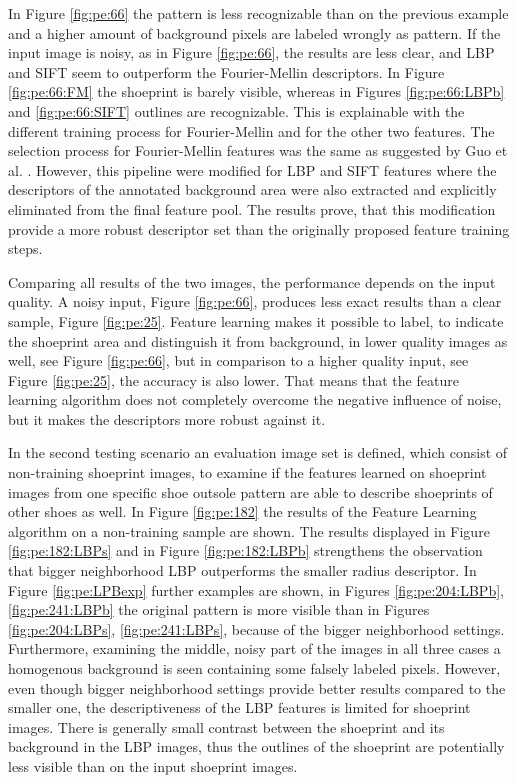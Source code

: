 \documentclass[draft,final]{vutinfth} %
\begin{document}
\par
In Figure \ref{fig:pe:66} the pattern is less recognizable than on the previous example and a higher amount of background pixels are labeled wrongly as pattern.
If the input image is noisy, as in Figure \ref{fig:pe:66}, the results are less clear, and LBP and SIFT seem to outperform the Fourier-Mellin descriptors.
In Figure \ref{fig:pe:66:FM} the shoeprint is barely visible, whereas in Figures \ref{fig:pe:66:LBPb} and \ref{fig:pe:66:SIFT} outlines are recognizable.
This is explainable with the different training process for Fourier-Mellin and for the other two features.
The selection process for Fourier-Mellin features was the same as suggested by Guo et al. \cite{guo2012discriminative}.
However, this pipeline were modified for LBP and SIFT features where the descriptors of the annotated background area were also extracted and explicitly eliminated from the final feature pool.
The results prove, that this modification provide a more robust descriptor set than the originally proposed feature training steps.
\par
Comparing all results of the two images, the performance depends on the input quality.
A noisy input, Figure \ref{fig:pe:66}, produces less exact results than a clear sample, Figure \ref{fig:pe:25}.
Feature learning makes it possible to label, to indicate the shoeprint area and distinguish it from background, in lower quality images as well,  see Figure \ref{fig:pe:66}, but in comparison to a higher quality input, see Figure \ref{fig:pe:25}, the accuracy is also lower.
That means that the feature learning algorithm does not completely overcome the negative influence of noise, but it makes the descriptors more robust against it.
\par
In the second testing scenario an evaluation image set is defined, which consist of non-training shoeprint images, to examine if the features learned on shoeprint images from one specific shoe outsole pattern are able to describe shoeprints of other shoes as well.
In Figure \ref{fig:pe:182} the results of the Feature Learning algorithm on a non-training sample are shown.
The results displayed in Figure \ref{fig:pe:182:LBPs} and in Figure \ref{fig:pe:182:LBPb} strengthens the observation that bigger neighborhood LBP outperforms the smaller radius descriptor.
In Figure \ref{fig:pe:LPBexp} further examples are shown, in Figures \ref{fig:pe:204:LBPb}, \ref{fig:pe:241:LBPb} the original pattern is more visible than in Figures \ref{fig:pe:204:LBPs}, \ref{fig:pe:241:LBPs}, because of the bigger neighborhood settings.
Furthermore, examining the middle, noisy part of the images in all three cases a homogenous background is seen containing some falsely labeled pixels.
However, even though bigger neighborhood settings provide better results compared to the smaller one, the descriptiveness of the LBP features is limited for shoeprint images.
There is generally small contrast between the shoeprint and its background in the LBP images, thus the outlines of the shoeprint are potentially less visible than on the input shoeprint images.
\end{document}
